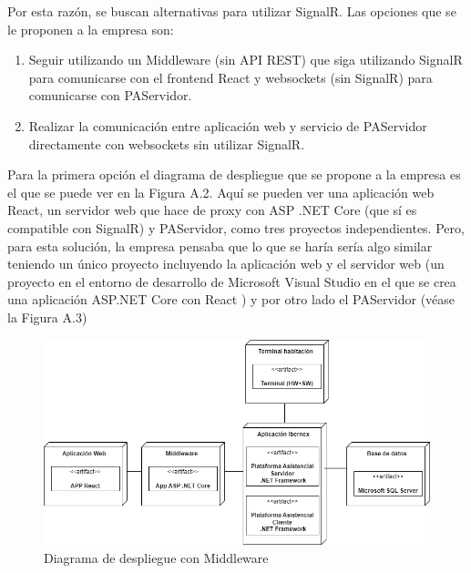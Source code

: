 Por esta razón, se buscan alternativas para utilizar SignalR. Las opciones que se le proponen a la empresa son: 
\begin{enumerate}
    \item Seguir utilizando un Middleware (sin API REST) que siga utilizando SignalR para comunicarse con el frontend React y websockets (sin SignalR) para comunicarse con PAServidor.
    \item Realizar la comunicación entre aplicación web y servicio de PAServidor directamente con websockets sin utilizar SignalR.
\end{enumerate}

Para la primera opción el diagrama de despliegue que se propone a la empresa es el que se puede ver en la Figura A.2. Aquí se pueden ver una aplicación web React, un servidor web que hace de proxy con ASP .NET Core (que sí es compatible con SignalR) y PAServidor, como tres proyectos independientes. Pero, para esta solución, la empresa pensaba que lo que se haría sería algo similar teniendo un único proyecto incluyendo la aplicación web y el servidor web (un proyecto en el entorno de desarrollo de Microsoft Visual Studio en el que se crea una aplicación ASP.NET Core con React \cite{vs-project} ) y por otro lado el PAServidor (véase la Figura A.3)\\

\begin{figure}[H]
    \centering
    \includegraphics[width=15cm]{Imagenes/Arquitectura-despliegue-2}
    \caption{Diagrama de despliegue con Middleware}
    \label{fig:despliegue-2}
\end{figure}


